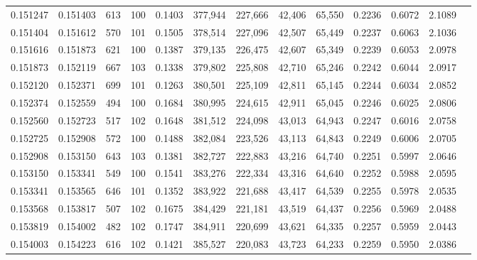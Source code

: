 \begin{tabular}{rrrrrrrrrrrrr}
0.151247 & 0.151403 &   613 & 100 &                                     0.1403 & 377,944 & 227,666 &  42,406 &  65,550 & 0.2236 & 0.6072 & 2.1089 \\
0.151404 & 0.151612 &   570 & 101 &                                     0.1505 & 378,514 & 227,096 &  42,507 &  65,449 & 0.2237 & 0.6063 & 2.1036 \\
0.151616 & 0.151873 &   621 & 100 &                                     0.1387 & 379,135 & 226,475 &  42,607 &  65,349 & 0.2239 & 0.6053 & 2.0978 \\
0.151873 & 0.152119 &   667 & 103 &                                     0.1338 & 379,802 & 225,808 &  42,710 &  65,246 & 0.2242 & 0.6044 & 2.0917 \\
0.152120 & 0.152371 &   699 & 101 &                                     0.1263 & 380,501 & 225,109 &  42,811 &  65,145 & 0.2244 & 0.6034 & 2.0852 \\
0.152374 & 0.152559 &   494 & 100 &                                     0.1684 & 380,995 & 224,615 &  42,911 &  65,045 & 0.2246 & 0.6025 & 2.0806 \\
0.152560 & 0.152723 &   517 & 102 &                                     0.1648 & 381,512 & 224,098 &  43,013 &  64,943 & 0.2247 & 0.6016 & 2.0758 \\
0.152725 & 0.152908 &   572 & 100 &                                     0.1488 & 382,084 & 223,526 &  43,113 &  64,843 & 0.2249 & 0.6006 & 2.0705 \\
0.152908 & 0.153150 &   643 & 103 &                                     0.1381 & 382,727 & 222,883 &  43,216 &  64,740 & 0.2251 & 0.5997 & 2.0646 \\
0.153150 & 0.153341 &   549 & 100 &                                     0.1541 & 383,276 & 222,334 &  43,316 &  64,640 & 0.2252 & 0.5988 & 2.0595 \\
0.153341 & 0.153565 &   646 & 101 &                                     0.1352 & 383,922 & 221,688 &  43,417 &  64,539 & 0.2255 & 0.5978 & 2.0535 \\
0.153568 & 0.153817 &   507 & 102 &                                     0.1675 & 384,429 & 221,181 &  43,519 &  64,437 & 0.2256 & 0.5969 & 2.0488 \\
0.153819 & 0.154002 &   482 & 102 &                                     0.1747 & 384,911 & 220,699 &  43,621 &  64,335 & 0.2257 & 0.5959 & 2.0443 \\
0.154003 & 0.154223 &   616 & 102 &                                     0.1421 & 385,527 & 220,083 &  43,723 &  64,233 & 0.2259 & 0.5950 & 2.0386 \\

\end{tabular}
